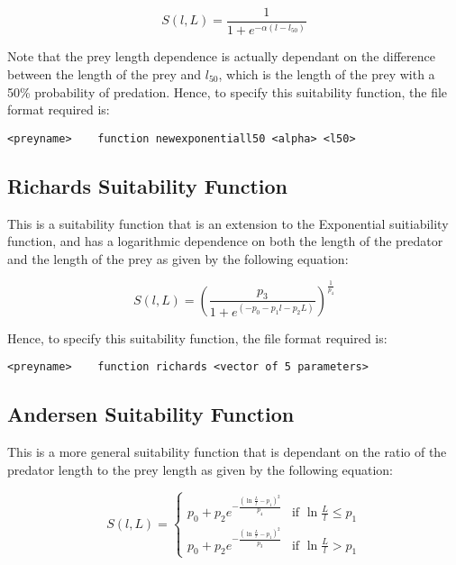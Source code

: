 \documentclass[10pt,twoside]{book}
\begin{document}
\begin{equation}\label{eq:l50suit}
S(l, L) = { \frac{1}{1 + e^{ -\alpha (l - l_{50})}}}
\end{equation}

Note that the prey length dependence is actually dependant on the difference between the length of the prey and $l_{50}$, which is the length of the prey with a 50\% probability of predation.  Hence, to specify this suitability function, the file format required is:

{\small\begin{verbatim}
<preyname>    function newexponentiall50 <alpha> <l50>
\end{verbatim}}

\subsection{Richards Suitability Function}
This is a suitability function that is an extension to the Exponential suitiability function, and has a logarithmic dependence on both the length of the predator and the length of the prey as given by the following equation:

\begin{equation}\label{eq:richsuit}
S(l, L) = \left({\frac{p_3}{1 + e^{(- p_0 - p_1 l - p_2  L)}}}\right) ^ {\frac{1}{p_4}}
\end{equation}

Hence, to specify this suitability function, the file format required is:

{\small\begin{verbatim}
<preyname>    function richards <vector of 5 parameters>
\end{verbatim}}

\subsection{Andersen Suitability Function}
This is a more general suitability function that is dependant on the ratio of the predator length to the prey length as given by the following equation:

\begin{equation}\label{eq:andersensuit}
S(l, L) =
\begin{cases}
p_0 + p_2e^{-\frac{(\ln\frac{L}{l} - p_1)^2}{p_4}} & \textrm{if $\ln\frac{L}{l} \leq p_1$} \\
p_0 + p_2e^{-\frac{(\ln\frac{L}{l} - p_1)^2}{p_3}} & \textrm{if $\ln\frac{L}{l} > p_1$}
\end{cases}
\end{equation}
\end{document}
